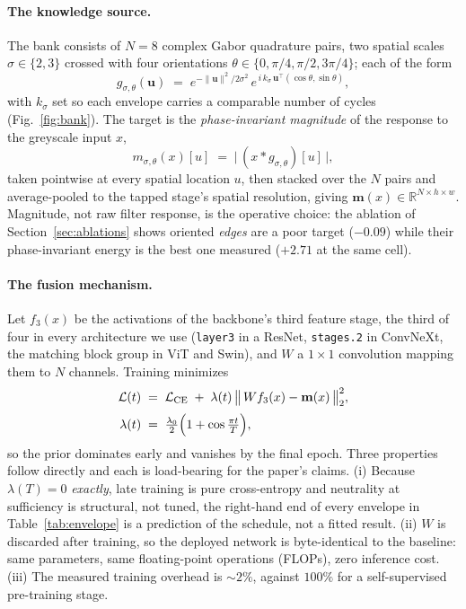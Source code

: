 \paragraph{The knowledge source.} The bank consists of $N{=}8$ complex
Gabor quadrature pairs, two spatial scales $\sigma \in \{2,3\}$ crossed
with four orientations $\theta \in \{0, \pi/4, \pi/2, 3\pi/4\}$; each
of the form
\begin{equation}
  g_{\sigma,\theta}(\mathbf{u}) \;=\;
  e^{-\lVert \mathbf{u}\rVert^{2}/2\sigma^{2}}\,
  e^{\,i\,k_\sigma\, \mathbf{u}^{\!\top} (\cos\theta, \sin\theta)},
  \label{eq:gabor}
\end{equation}
with $k_\sigma$ set so each envelope carries a comparable number of
cycles (Fig.~\ref{fig:bank}). The target is the \emph{phase-invariant magnitude} of the
response to the greyscale input $x$,
\begin{equation}
  m_{\sigma,\theta}(x)[u] \;=\; \bigl|\, (x * g_{\sigma,\theta})[u] \,\bigr|,
  \label{eq:energy}
\end{equation}
taken pointwise at every spatial location $u$, then stacked over the $N$
pairs and average-pooled to the tapped stage's
spatial resolution, giving $\mathbf{m}(x)\in\mathbb{R}^{N\times h\times w}$.
Magnitude, not raw filter response, is the operative choice: the
ablation of Section~\ref{sec:ablations} shows oriented \emph{edges} are a
poor target ($-0.09$) while their phase-invariant energy is the best one
 measured ($+2.71$ at the same cell).

\paragraph{The fusion mechanism.} Let $f_3(x)$ be the activations of the
backbone's third feature stage, the third of four in every architecture we
use (\texttt{layer3} in a ResNet, \texttt{stages.2} in ConvNeXt, the
matching block group in ViT and Swin), and $W$ a $1{\times}1$ convolution
mapping them to $N$ channels. Training minimizes
\begin{equation}
  \begin{aligned}
    \mathcal{L}(t) &\;=\; \mathcal{L}_{\mathrm{CE}}
      \;+\; \lambda(t)\,
      \bigl\lVert\, W f_3(x) - \mathbf{m}(x) \,\bigr\rVert_2^2,\\[2pt]
    \lambda(t) &\;=\; \tfrac{\lambda_0}{2}
      \Bigl(1+\cos\tfrac{\pi t}{T}\Bigr),
  \end{aligned}
  \label{eq:loss}
\end{equation}
so the prior dominates early and vanishes by the final epoch. Three
properties follow directly and each is load-bearing for the paper's
claims. (i) Because $\lambda(T)=0$ \emph{exactly}, late training is pure
cross-entropy and neutrality at sufficiency is structural, not tuned,
the right-hand end of every envelope in Table~\ref{tab:envelope} is a
prediction of the schedule, not a fitted result. (ii) $W$ is discarded
after training, so the deployed network is byte-identical to the
baseline: same parameters, same floating-point operations (FLOPs), zero
inference cost. (iii) The
measured training overhead is ${\sim}2\%$, against $100\%$ for a
self-supervised pre-training stage.

